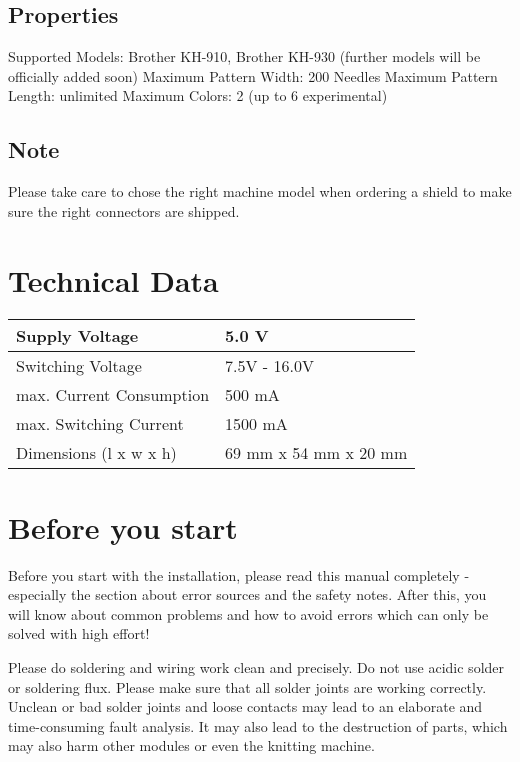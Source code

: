 \documentclass[fleqn,10pt]{SelfArx} %
\begin{document}
 \subsection*{Properties}

Supported Models: Brother KH-910, Brother KH-930 (further models will be officially added soon)
Maximum Pattern Width: 200 Needles
Maximum Pattern Length: unlimited
Maximum Colors: 2 (up to 6 experimental)

 \subsection*{Note}

Please take care to chose the right machine model when ordering a shield to make sure the right connectors are shipped.


\section{Technical Data}

\begin{tabular}{ll}
Supply Voltage            & 5.0 V              \\ \hline
Switching Voltage         & 7.5V - 16.0V       \\ \hline
max. Current Consumption  & 500 mA             \\ \hline
max. Switching Current    & 1500 mA            \\ \hline
Dimensions (l x w x h)    & 69 mm x 54 mm x 20 mm
\end{tabular}



\section{Before you start}

Before you start with the installation, please read this manual completely - especially the section about error sources and the safety notes. After this, you will know about common problems and how to avoid errors which can only be solved with high effort!

Please do soldering and wiring work clean and precisely. Do not use acidic solder or soldering flux. Please make sure that all solder joints are working correctly. Unclean or bad solder joints and loose contacts may lead to an elaborate and time-consuming fault analysis. It may also lead to the destruction of parts, which may also harm other modules or even the knitting machine.
\end{document}
